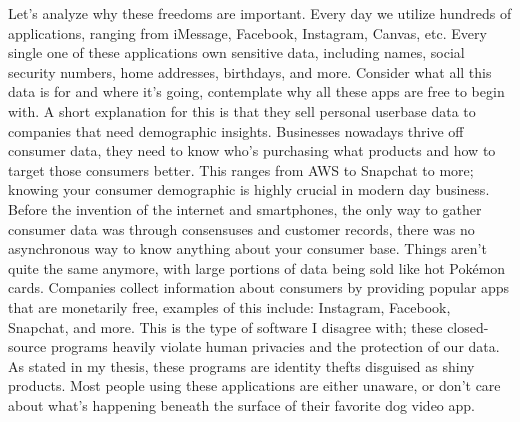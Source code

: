 \documentclass[11pt]{article}
\begin{document}
Let's analyze why these freedoms are important. Every day we utilize hundreds of applications, ranging from iMessage, Facebook, Instagram, Canvas, etc. Every single one of these applications own sensitive data, including names, social security numbers, home addresses, birthdays, and more. Consider what all this data is for and where it's going, contemplate why all these apps are free to begin with. A short explanation for this is that they sell personal userbase data to companies that need demographic insights. Businesses nowadays thrive off consumer data, they need to know who's purchasing what products and how to target those consumers better. This ranges from AWS to Snapchat to more; knowing your consumer demographic is highly crucial in modern day business. Before the invention of the internet and smartphones, the only way to gather consumer data was through consensuses and customer records, there was no asynchronous way to know anything about your consumer base. Things aren't quite the same anymore, with large portions of data being sold like hot Pokémon cards. Companies collect information about consumers by providing popular apps that are monetarily free, examples of this include: Instagram, Facebook, Snapchat, and more. This is the type of software I disagree with; these closed-source programs heavily violate human privacies and the protection of our data. As stated in my thesis, these programs are identity thefts disguised as shiny products. Most people using these applications are either unaware, or don't care about what's happening beneath the surface of their favorite dog video app.
\end{document}
